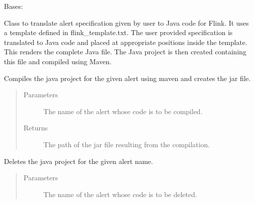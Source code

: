 \documentclass[letterpaper,10pt,english]{sphinxmanual}
\begin{document}
\begin{fulllineitems}
\label{\detokenize{flink:flink_code_gen.FlinkCodeGenerator}}
Bases: 

Class to translate alert specification given by user to Java code for Flink. It uses a template defined in
flink\_template.txt. The user provided specification is translated to Java code and placed at appropriate
positions inside the template. This renders the complete Java file. The Java project is then created
containing this file and compiled using Maven.

\begin{fulllineitems}
\label{\detokenize{flink:flink_code_gen.FlinkCodeGenerator.compile_code}}
Compiles the java project for the given alert using maven and creates the jar file.
\begin{quote}\begin{description}
\item[{Parameters}] \leavevmode
{} \textendash{} The name of the alert whose code is to be compiled.

\item[{Returns}] \leavevmode
The path of the jar file resulting from the compilation.

\end{description}\end{quote}

\end{fulllineitems}


\begin{fulllineitems}
\label{\detokenize{flink:flink_code_gen.FlinkCodeGenerator.delete_code}}
Deletes the java project for the given alert name.
\begin{quote}\begin{description}
\item[{Parameters}] \leavevmode
{} \textendash{} The name of the alert whose code is to be deleted.

\end{description}\end{quote}


\end{fulllineitems}
\end{fulllineitems}
\end{document}
